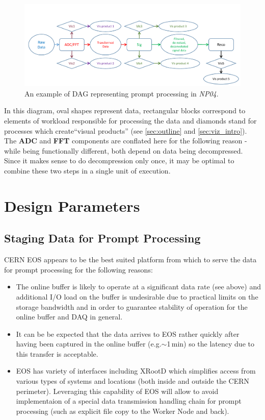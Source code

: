 \documentclass[pdftex,12pt,letter]{article}
\newcommand{\xrd}{XRootD\xspace}
\newcommand{\expname}{\textit{NP04}\xspace}
\begin{document}
\begin{figure}[tbh]
  \centering
  \includegraphics[width=1.0\textwidth]{figures/prompt_dag_2.pdf}
  \caption{An example of DAG representing prompt processing in \expname.}
  \label{fig:dag1}
\end{figure}
In this diagram, oval shapes represent data, rectangular blocks correspond to
elements of workload responsible for processing the data and diamonds stand for processes
which create``visual products'' (see \ref{sec:outline} and \ref{sec:viz_intro}).
The \textbf{ADC} and \textbf{FFT} components are conflated here for the following reason - while being functionally
different, both depend on data being decompressed. Since it makes sense to do decompression only once, it may
be optimal to combine these two steps in a single unit of execution.


\section{Design Parameters}
\label{sec:parameters}

\subsection{Staging Data for Prompt Processing}
\label{sec:staging}
CERN EOS appears to be the best suited platform from which to
serve the data for prompt processing for the following reasons:
\begin{itemize}

\item The online buffer is likely to operate at a significant data rate (see above) and additional I/O load on the
buffer is undesirable due to practical limits on the storage bandwidth and in order to guarantee stability of
operation for the online buffer and DAQ in general.

\item It can be be expected that the data arrives to EOS rather quickly after having been captured in the online buffer
(e.g.$\sim$1\,min) so the latency due to this transfer is acceptable.

\item EOS has variety of interfaces including \xrd \cite{xrootd} which simplifies access from various types of
systems and  locations (both inside and outside the CERN perimeter). Leveraging this capability of EOS will
allow to avoid implementaion of a special data transmission handling chain for prompt processing
(such as explicit file copy to the Worker Node and back).

\end{itemize}
\end{document}
